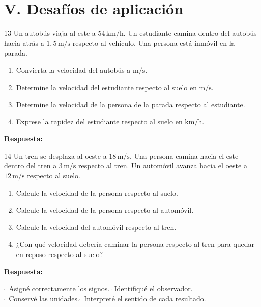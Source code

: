 \documentclass[11pt,letterpaper]{article}
\newcommand{\espacio}[1]{\par\vspace{#1}\par}
\newcommand{\renglon}{\par\textcolor{morado}{\bfseries Respuesta:}\ \dotfill\par}
\begin{document}
\section*{V. Desafíos de aplicación}
\begin{problema}{13}
Un autobús viaja al este a $54\,\mathrm{km/h}$. Un estudiante camina dentro del autobús hacia atrás a $1,5\,\mathrm{m/s}$ respecto al vehículo. Una persona está inmóvil en la parada.
\begin{enumerate}[label=\alph*)]
\item Convierta la velocidad del autobús a $\mathrm{m/s}$.
\item Determine la velocidad del estudiante respecto al suelo en $\mathrm{m/s}$.
\item Determine la velocidad de la persona de la parada respecto al estudiante.
\item Exprese la rapidez del estudiante respecto al suelo en $\mathrm{km/h}$.
\end{enumerate}
\espacio{4cm}\renglon
\end{problema}
\clearpage
\begin{problema}{14}
Un tren se desplaza al oeste a $18\,\mathrm{m/s}$. Una persona camina hacia el este dentro del tren a $3\,\mathrm{m/s}$ respecto al tren. Un automóvil avanza hacia el oeste a $12\,\mathrm{m/s}$ respecto al suelo.
\begin{enumerate}[label=\alph*)]
\item Calcule la velocidad de la persona respecto al suelo.
\item Calcule la velocidad de la persona respecto al automóvil.
\item Calcule la velocidad del automóvil respecto al tren.
\item ¿Con qué velocidad debería caminar la persona respecto al tren para quedar en reposo respecto al suelo?
\end{enumerate}
\espacio{5cm}\renglon
\end{problema}
\begin{tcolorbox}[colback=orange!5,colframe=naranja,title=\bfseries Revisión final,arc=2mm]
$\square$ Asigné correctamente los signos.\qquad $\square$ Identifiqué el observador.\\
$\square$ Conservé las unidades.\qquad $\square$ Interpreté el sentido de cada resultado.
\end{tcolorbox}
\end{document}
